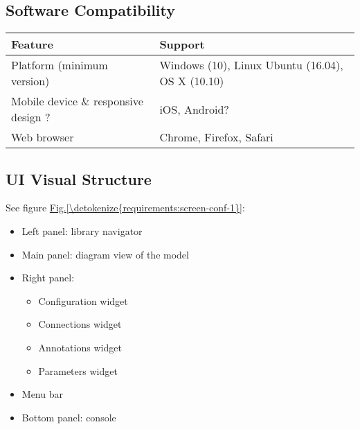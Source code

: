 \documentclass[letterpaper,10pt, openany,english]{sphinxmanual}
\begin{document}
\subsection{Software Compatibility}
\label{\detokenize{requirements:software-compatibility}}

\begin{savenotes}\sphinxattablestart
\centering
{}
\sphinxthecaptionisattop
{}\label{\detokenize{requirements:id14}}\label{\detokenize{requirements:tab-environment}}
\sphinxaftertopcaption
\begin{tabulary}{\linewidth}[t]{|T|T|}
\hline
\sphinxstyletheadfamily 
Feature
&\sphinxstyletheadfamily 
Support
\\
\hline
Platform (minimum version)
&
Windows (10), Linux Ubuntu (16.04), OS X (10.10)
\\
\hline
Mobile device \& responsive design ?
&
iOS, Android?
\\
\hline
Web browser
&
Chrome, Firefox, Safari
\\
\hline
\end{tabulary}
\par
\sphinxattableend\end{savenotes}


\subsection{UI Visual Structure}
\label{\detokenize{requirements:ui-visual-structure}}
See figure \hyperref[\detokenize{requirements:screen-conf-1}]{Fig.\@ \ref{\detokenize{requirements:screen-conf-1}}}:
\begin{itemize}
\item {} 
Left panel: library navigator

\item {} 
Main panel: diagram view of the model

\item {} 
Right panel:
\begin{itemize}
\item {} 
Configuration widget

\item {} 
Connections widget

\item {} 
Annotations widget

\item {} 
Parameters widget

\end{itemize}

\item {} 
Menu bar

\item {} 
Bottom panel: console

\end{itemize}
\end{document}
